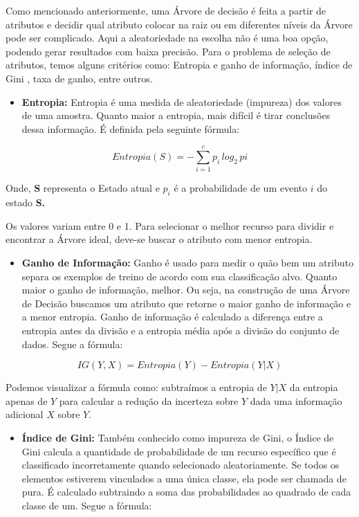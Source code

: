\documentclass[
  letterpaper,
  DIV=11,
  numbers=noendperiod]{scrreprt}
\providecommand{\tightlist}{%
  \setlength{\itemsep}{0pt}\setlength{\parskip}{0pt}}\usepackage{longtable,booktabs,array}
\begin{document}
Como mencionado anteriormente, uma Árvore de decisão é feita a partir de
atributos e decidir qual atributo colocar na raiz ou em diferentes
níveis da Árvore pode ser complicado. Aqui a aleatoriedade na escolha
não é uma boa opção, podendo gerar resultados com baixa precisão. Para o
problema de seleção de atributos, temos alguns critérios como: Entropia
e ganho de informação, índice de Gini , taxa de ganho, entre outros.

\begin{itemize}
\tightlist
\item
  \textbf{Entropia:} Entropia é uma medida de aleatoriedade (impureza)
  dos valores de uma amostra. Quanto maior a entropia, mais difícil é
  tirar conclusões dessa informação. É definida pela seguinte fórmula:
\end{itemize}

\[
Entropia(S) = - \sum_{i=1}^{c} p_{i}\,log_2\,pi
\]

Onde, \textbf{S} representa o Estado atual e \(p_i\) é a probabilidade
de um evento \(i\) do estado \textbf{S.}

Os valores variam entre 0 e 1. Para selecionar o melhor recurso para
dividir e encontrar a Árvore ideal, deve-se buscar o atributo com menor
entropia.

\begin{itemize}
\tightlist
\item
  \textbf{Ganho de Informação:} Ganho é usado para medir o quão bem um
  atributo separa os exemplos de treino de acordo com sua classificação
  alvo. Quanto maior o ganho de informação, melhor. Ou seja, na
  construção de uma Árvore de Decisão buscamos um atributo que retorne o
  maior ganho de informação e a menor entropia. Ganho de informação é
  calculado a diferença entre a entropia antes da divisão e a entropia
  média após a divisão do conjunto de dados. Segue a fórmula:
\end{itemize}

\[
IG(Y,X) = Entropia(Y) - Entropia (Y|X)
\]

Podemos visualizar a fórmula como: subtraímos a entropia de \(Y|X\) da
entropia apenas de \(Y\) para calcular a redução da incerteza sobre
\(Y\) dada uma informação adicional \(X\) sobre \(Y\).

\begin{itemize}
\tightlist
\item
  \textbf{Índice de Gini:} Também conhecido como impureza de Gini, o
  Índice de Gini calcula a quantidade de probabilidade de um recurso
  específico que é classificado incorretamente quando selecionado
  aleatoriamente. Se todos os elementos estiverem vinculados a uma única
  classe, ela pode ser chamada de pura. É calculado subtraindo a soma
  das probabilidades ao quadrado de cada classe de um. Segue a fórmula:
\end{itemize}
\end{document}
